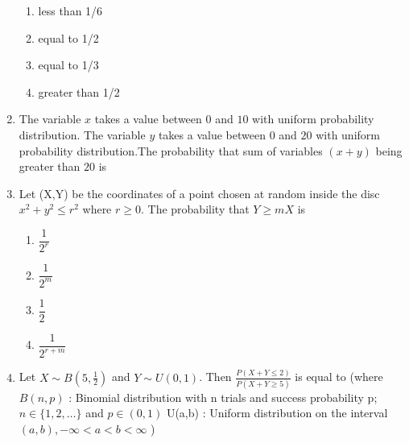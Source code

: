 \begin{enumerate}[label=\thesection.\arabic*.,ref=\thesection.\theenumi]
\begin{enumerate}
    \item less than 1/6
    \item equal to 1/2
    \item equal to 1/3
    \item greater than 1/2

\end{enumerate}
\solution
  
  \item The variable $x$ takes a value between $0$ and $10$ with uniform probability distribution. The variable $y$ takes a value between $0$ and $20$ with uniform probability distribution.The probability that sum of variables $(x+y)$ being greater than $20$ is
%
\item Let (X,Y) be the coordinates of a point chosen at random inside the disc $x^2 + y^2 \leq r^2$ where $r\geq 0$. The probability that $Y \geq mX$ is
\begin{enumerate}[label = (\alph*)]
\setlength\itemsep{2em}
    \item $\dfrac{1}{2^r}$
    \item $\dfrac{1}{2^m}$
    \item $\dfrac{1}{2}$
    \item $\dfrac{1}{2^{r+m}}$
\end{enumerate}
%
\solution
  
%
\item Let $X \sim B(5,\frac{1}{2})$ and $Y \sim U(0,1)$. Then $\frac{P(X + Y \leq 2)}{P(X + Y \geq 5)}$ is equal to 
(where 
$B(n,p)$ : Binomial distribution with n trials and success probability p; $n \in \{1,2, \dots \}$ and  $p \in (0,1)$
U(a,b) : Uniform distribution on the interval $(a,b), -\infty < a < b < \infty$  )
\\
\solution
  



\end{enumerate}